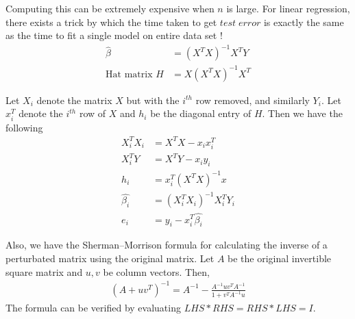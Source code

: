 \documentclass[../statistical_learning_notes.tex]{subfiles}
\begin{document}
    Computing this can be extremely expensive when $n$ is large. For linear regression, there exists a trick by which the time taken to get $test\;error$ is exactly the same as the time to fit a single model on entire data set !\newline
    \begin{align*}
        \hat{\beta} &= (X^{T}X)^{-1}X^{T}Y \\
        \text{Hat matrix  } H &= X(X^{T}X)^{-1}X^{T}
    \end{align*}
    
    Let $X_{i}$ denote the matrix $X$ but with the $i^{th}$ row removed, and similarly $Y_{i}$. Let $x_{i}^{T}$ denote the $i^{th}$ row of $X$ and $h_{i}$ be the diagonal entry of $H$. Then we have the following
    \begin{align*}
        X_{i}^{T}X_{i} &= X^{T}X - x_{i}x_{i}^{T}\\
        X_{i}^{T}Y &= X^{T}Y - x_{i}y_{i}\\
        h_{i} &= x_{i}^{T}(X^{T}X)^{-1}x \\
        \hat{\beta_{i}} &= (X_{i}^{T}X_{i})^{-1}X_{i}^{T}Y_{i} \\
        e_{i} &= y_{i} - x_{i}^{T}\hat{\beta_{i}}
    \end{align*}

    Also, we have the Sherman–Morrison formula for calculating the inverse of a perturbated matrix using the original matrix. Let $A$ be the original invertible square matrix and $u,v$ be column vectors. Then,
    \begin{align*}
        (A + uv^{T})^{-1} = A^{-1} - \frac{A^{-1}uv^{T}A^{-1}}{1+v^{T}A^{-1}u}
    \end{align*}
    The formula can be verified by evaluating $LHS * RHS = RHS * LHS = I$. \newline
\end{document}
